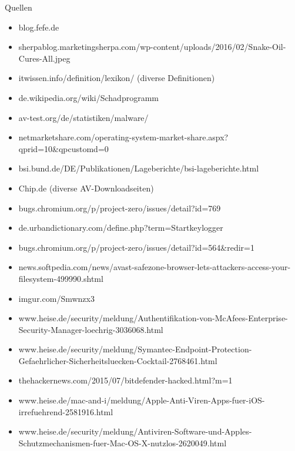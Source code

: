 \documentclass{beamer}
\begin{document}
	
	\begin{frame}[allowframebreaks]{Quellen}
		\footnotesize
		\begin{itemize}
			\item blog.fefe.de
			\item sherpablog.marketingsherpa.com/wp-content/uploads/2016/02/Snake-Oil-Cures-All.jpeg
			\item itwissen.info/definition/lexikon/ (diverse Definitionen)
			\item de.wikipedia.org/wiki/Schadprogramm
			\item av-test.org/de/statistiken/malware/
			\item netmarketshare.com/operating-system-market-share.aspx?qprid=10\&qpcustomd=0
			\item bsi.bund.de/DE/Publikationen/Lageberichte/bsi-lageberichte.html
			\item Chip.de (diverse AV-Downloadseiten)
			\item bugs.chromium.org/p/project-zero/issues/detail?id=769
			\item de.urbandictionary.com/define.php?term=Startkeylogger 
			\item bugs.chromium.org/p/project-zero/issues/detail?id=564\&redir=1
			\item news.softpedia.com/news/avast-safezone-browser-lets-attackers-access-your-filesystem-499990.shtml
			\item imgur.com/Smwnzx3
			\item www.heise.de/security/meldung/Authentifikation-von-McAfees-Enterprise-Security-Manager-loechrig-3036068.html
			\item www.heise.de/security/meldung/Symantec-Endpoint-Protection-Gefaehrlicher-Sicherheitsluecken-Cocktail-2768461.html
			\item thehackernews.com/2015/07/bitdefender-hacked.html?m=1
			\item www.heise.de/mac-and-i/meldung/Apple-Anti-Viren-Apps-fuer-iOS-irrefuehrend-2581916.html
			\item www.heise.de/security/meldung/Antiviren-Software-und-Apples-Schutzmechanismen-fuer-Mac-OS-X-nutzlos-2620049.html
		\end{itemize}

		
	\end{frame}
	
	
	
\end{document}
